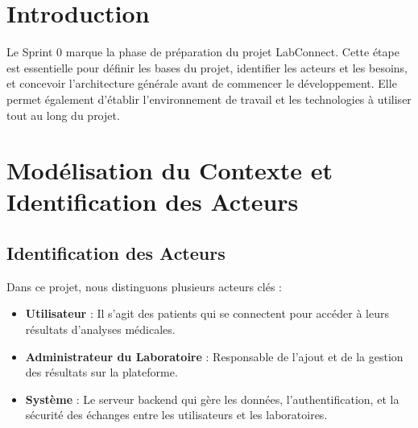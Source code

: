 \documentclass[12pt,a4paper]{report}
\begin{document}
\section{Introduction}
Le Sprint 0 marque la phase de préparation du projet LabConnect. Cette étape est essentielle pour définir les bases du projet, identifier les acteurs et les besoins, et concevoir l'architecture générale avant de commencer le développement. Elle permet également d'établir l'environnement de travail et les technologies à utiliser tout au long du projet.

\section{Modélisation du Contexte et Identification des Acteurs}

\subsection{Identification des Acteurs}
Dans ce projet, nous distinguons plusieurs acteurs clés :

\begin{itemize}
    \item \textbf{Utilisateur} : Il s'agit des patients qui se connectent pour accéder à leurs résultats d'analyses médicales.
    
    \item \textbf{Administrateur du Laboratoire} : Responsable de l'ajout et de la gestion des résultats sur la plateforme.
    
    \item \textbf{Système} : Le serveur backend qui gère les données, l'authentification, et la sécurité des échanges entre les utilisateurs et les laboratoires.
\end{itemize}
\end{document}
